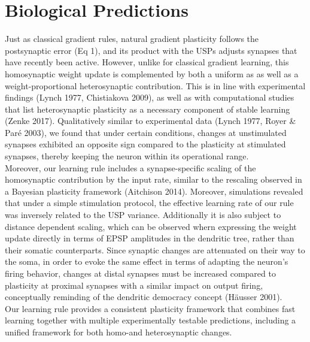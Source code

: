 \documentclass[twocolumn,12pt]{article}
\begin{document}
\section*{Biological Predictions}
\vspace*{-0.3cm}
Just as classical gradient rules, natural gradient plasticity follows the postsynaptic error (Eq 1), and its product with the USPs adjusts synapses that have recently been active. However, unlike for classical gradient learning, this homosynaptic weight update is complemented by both a uniform as as well as a weight-proportional heterosynaptic contribution. This is in line with experimental findings (Lynch 1977, Chistiakova 2009), as well as with computational studies that list heterosynaptic plasticity as a necessary component of stable learning (Zenke 2017). Qualitatively similar to experimental data (Lynch 1977, Royer \& Paré 2003), we found that under certain conditions, changes at unstimulated synapses exhibited an opposite sign compared to the plasticity at stimulated synapses, thereby keeping the neuron within its operational range.\\
Moreover, our learning rule includes a synapse-specific scaling of the homosynaptic contribution by the input rate, similar to the rescaling observed in a Bayesian plasticity framework (Aitchison 2014). Moreover, simulations revealed that under a simple stimulation protocol, the effective learning rate of our rule was inversely related to the USP variance. Additionally it is also subject to distance dependent scaling, which can be observed whern expressing the weight update directly in terms of EPSP amplitudes in the dendritic tree, rather than their somatic counterparts.
 Since synaptic changes are attenuated on their way to the soma, in order to evoke the same effect in terms of adapting the neuron's firing behavior, changes at distal synapses must be increased compared to plasticity at proximal synapses with a similar impact on output firing, conceptually reminding of the dendritic democracy concept (Häusser 2001).\\
 Our learning rule provides a consistent plasticity framework that combines fast learning together with multiple experimentally testable predictions, including a unified framework for both homo-and heterosynaptic changes.
\end{document}
